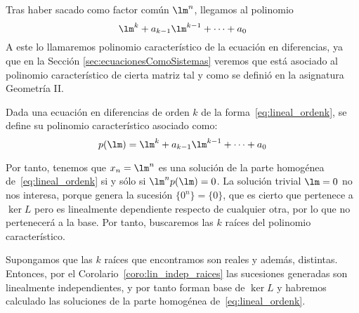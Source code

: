 Tras haber sacado como factor común $\lm^n$, llegamos al polinomio 
\begin{equation*}
    \lm^k + a_{k-1}\lm^{k-1} + \dots + a_0
\end{equation*}
A este lo llamaremos polinomio característico de la ecuación en diferencias, ya que en la Sección \ref{sec:ecuacionesComoSistemas} veremos que
está asociado al polinomio característico de cierta matriz tal y como se definió en la asignatura Geometría II.
\begin{definicion}
    Dada una ecuación en diferencias de orden $k$ de la forma~\ref{eq:lineal_ordenk}, se define su polinomio característico asociado como:
    \begin{equation*}
        p(\lm)=\lm^k + a_{k-1}\lm^{k-1} + \dots + a_0
    \end{equation*}
\end{definicion}

Por tanto, tenemos que $x_n=\lm^n$ es una solución de la parte homogénea de~\ref{eq:lineal_ordenk} si y sólo si $\lm^n p(\lm)=0$. La solución trivial $\lm=0$ no nos interesa, porque genera la sucesión $\{0^n\}=\{0\}$, que es cierto que pertenece a $\ker L$ pero es linealmente dependiente respecto de cualquier otra, por lo que no pertenecerá a la base. Por tanto, buscaremos las $k$ raíces del polinomio característico.

Supongamos que las $k$ raíces que encontramos son reales y además, distintas. Entonces, por el Corolario~\ref{coro:lin_indep_raices} las sucesiones generadas son linealmente independientes, y por tanto forman base de $\ker L$ y habremos calculado las soluciones de la parte homogénea de~\ref{eq:lineal_ordenk}.

